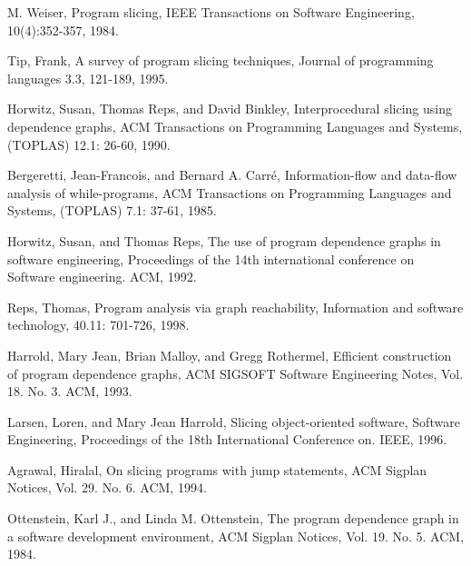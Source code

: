 \documentclass[oneside,12pt,a4paper]{book}
\begin{document}
\begin{thebibliography}{Textttext}
  M. Weiser,
  Program slicing,
  IEEE Transactions on Software Engineering,
  10(4):352-357,
  1984.

  Tip, Frank,
  A survey of program slicing techniques,
  Journal of programming languages 3.3,
  121-189,
  1995. 

  Horwitz, Susan, Thomas Reps, and David Binkley,
  Interprocedural slicing using dependence graphs, 
  ACM Transactions on Programming Languages and Systems,
  (TOPLAS) 12.1: 26-60,
  1990.

  Bergeretti, Jean-Francois, and Bernard A. Carré,
  Information-flow and data-flow analysis of while-programs,
  ACM Transactions on Programming Languages and Systems,
  (TOPLAS) 7.1: 37-61,
  1985.

  Horwitz, Susan, and Thomas Reps,
  The use of program dependence graphs in software engineering,
  Proceedings of the 14th international conference on Software engineering. 
  ACM,
  1992.

  Reps, Thomas,
  Program analysis via graph reachability,
  Information and software technology,
  40.11: 701-726,
  1998.

  Harrold, Mary Jean, Brian Malloy, and Gregg Rothermel,
  Efficient construction of program dependence graphs,
  ACM SIGSOFT Software Engineering Notes,
  Vol. 18. No. 3. ACM,
  1993.

  Larsen, Loren, and Mary Jean Harrold,
  Slicing object-oriented software,
  Software Engineering,
  Proceedings of the 18th International Conference on. IEEE,
  1996.

  Agrawal, Hiralal,
  On slicing programs with jump statements,
  ACM Sigplan Notices,
  Vol. 29. No. 6. ACM,
  1994.

  Ottenstein, Karl J., and Linda M. Ottenstein,
  The program dependence graph in a software development environment,
  ACM Sigplan Notices,
  Vol. 19. No. 5. ACM,
  1984.

\end{thebibliography}
\end{document}
